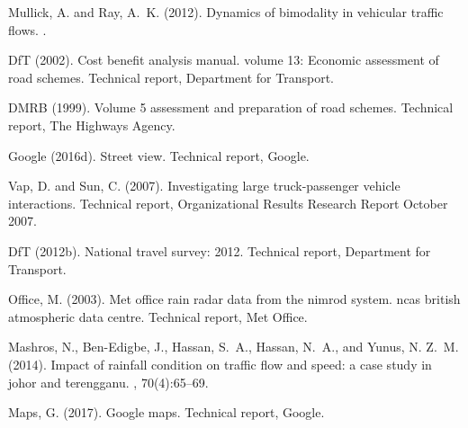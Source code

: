 \documentclass{CUP-JNL-DCE}
\begin{document}
\begin{Backmatter}
\begin{thebibliography}{}
Mullick, A. and Ray, A.~K. (2012).
\newblock Dynamics of bimodality in vehicular traffic flows.
.


DfT (2002).
\newblock Cost benefit analysis manual. volume 13: Economic assessment of road
schemes.
\newblock Technical report, Department for Transport.

DMRB (1999).
\newblock Volume 5 assessment and preparation of road schemes.
\newblock Technical report, The Highways Agency.

Google (2016d).
\newblock Street view.
\newblock Technical report, Google.

Vap, D. and Sun, C. (2007).
\newblock Investigating large truck-passenger vehicle interactions.
\newblock Technical report, Organizational Results Research Report October
2007.

DfT (2012b).
\newblock National travel survey: 2012.
\newblock Technical report, Department for Transport.

Office, M. (2003).
\newblock Met office rain radar data from the nimrod system. ncas british
atmospheric data centre.
\newblock Technical report, Met Office.

Mashros, N., Ben-Edigbe, J., Hassan, S.~A., Hassan, N.~A., and Yunus, N. Z.~M.
(2014).
\newblock Impact of rainfall condition on traffic flow and speed: a case study
in johor and terengganu.
, 70(4):65--69.

Maps, G. (2017).
\newblock Google maps.
\newblock Technical report, Google.

\end{thebibliography}

\end{Backmatter}
\end{document}
